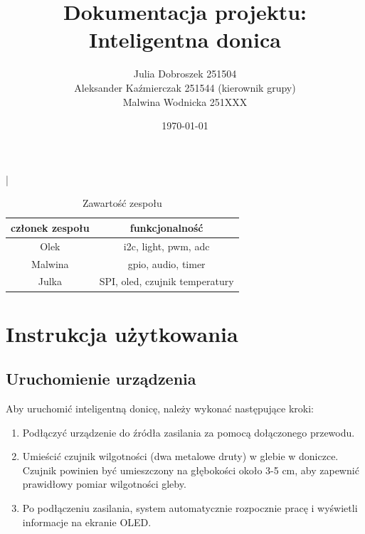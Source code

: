 \documentclass{article}
\title{Dokumentacja projektu: Inteligentna donica}
\author{
  Julia Dobroszek 251504 \\
  Aleksander Kaźmierczak 251544 (kierownik grupy)\\
  Malwina Wodnicka 251XXX \\  %
}
\date{\today}
\begin{document}
\maketitle

|%
\begin{table}[H]
    \centering
    \begin{tabular}{|c|c|}
    \hline
    członek zespołu & funkcjonalność\\
    \hline
    Olek & i2c, light, pwm, adc\\
    Malwina & gpio, audio, timer\\
    Julka & SPI, oled, czujnik temperatury\\
    \hline
    \end{tabular}
    \caption{Zawartość zespołu}
\end{table}


\section{Instrukcja użytkowania}

\subsection{Uruchomienie urządzenia}
Aby uruchomić inteligentną donicę, należy wykonać następujące kroki:
\begin{enumerate}
    \item Podłączyć urządzenie do źródła zasilania za pomocą dołączonego przewodu.
    \item Umieścić czujnik wilgotności (dwa metalowe druty) w glebie w doniczce. Czujnik powinien być umieszczony na głębokości około 3-5 cm, aby zapewnić prawidłowy pomiar wilgotności gleby.
    \item Po podłączeniu zasilania, system automatycznie rozpocznie pracę i wyświetli informacje na ekranie OLED.
    
\end{enumerate}
\end{document}
